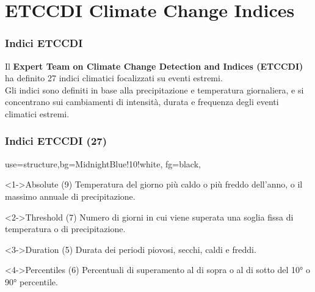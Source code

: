 \section{ETCCDI Climate Change Indices}

\begin{frame}
\frametitle{Indici ETCCDI}
Il \textbf{Expert Team on Climate Change Detection and Indices (ETCCDI)} ha definito 27 indici climatici focalizzati su eventi estremi. \\
\vspace{0.5cm}
Gli indici sono definiti in base alla precipitazione e temperatura giornaliera, e si concentrano sui cambiamenti di intensità, durata e frequenza degli eventi climatici estremi.
\end{frame}


\begin{frame}
  \frametitle{Indici ETCCDI (27)}
   {use=structure,bg=MidnightBlue!10!white, fg=black,}

	\begin{block}<1->{Absolute (9)}
	  Temperatura del giorno più caldo o più freddo dell'anno, o il massimo annuale di precipitazione.
	\end{block}


	\begin{block}<2->{Threshold (7)}
    Numero di giorni in cui viene superata una soglia fissa di temperatura o di precipitazione.
  \end{block}


	\begin{block}<3->{Duration (5)}
	 Durata dei periodi piovosi, secchi, caldi e freddi.
  \end{block}
  
    \begin{block}<4->{Percentiles (6)}
     Percentuali di superamento al di sopra o al di sotto del 10° o 90° percentile. 
  \end{block}
  
  
\end{frame}